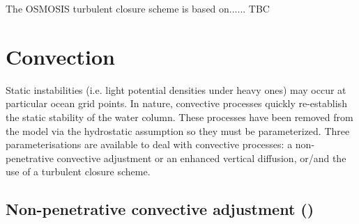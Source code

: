 \documentclass[../tex_main/NEMO_manual]{subfiles}
\begin{document}


The OSMOSIS turbulent closure scheme is based on......   TBC

\section{Convection}
\label{sec:ZDF_conv}



Static instabilities (i.e. light potential densities under heavy ones) may occur at particular ocean grid points.
In nature, convective processes quickly re-establish the static stability of the water column.
These processes have been removed from the model via the hydrostatic assumption so they must be parameterized.
Three parameterisations are available to deal with convective processes:
a non-penetrative convective adjustment or an enhanced vertical diffusion,
or/and the use of a turbulent closure scheme.

\subsection[Non-penetrative convective adjmt (\protect\np{ln\_tranpc}\forcode{ = .true.})]
				{Non-penetrative convective adjustment (\protect{})}
\label{subsec:ZDF_npc}


\end{document}

